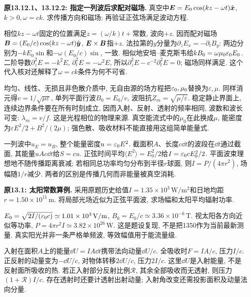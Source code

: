 \label{tb:wave-directions}
\begin{example}
\textbf{原13.12.1、13.12.2: 指定一列波后求配对磁场.} 真空中$\boldsymbol{E}=E_0\cos(kz-\omega t)\hat{\boldsymbol{x}}$, $k>0,\omega=ck$. 求传播方向和磁场; 再验证正弦场满足波动方程.
\end{example}
\begin{solution}
相位$kz-\omega t$固定的位置满足$z=(\omega/k)t+\text{常数}$, 波向$+z$. 因而配对磁场$\boldsymbol{B}=(E_0/c)\cos(kz-\omega t)\hat{\boldsymbol{y}}$, $\boldsymbol{E}\times\boldsymbol{B}$指$+z$. 法拉第的$y$分量为$\partial_zE_x=-\partial_tB_y$: 两边分别为$-kE_0\sin$和$-\omega(E_0/c)\sin$, 一致. 相似地安培--麦克斯韦给$kB_0=\omega\mu_0\varepsilon_0 E_0$. 二阶导数$\partial_z^2E=-k^2E$, $\partial_t^2E=-\omega^2E$, 所以$\partial_z^2E-c^{-2}\partial_t^2E=0$; 磁场同样满足. 这个代入核对还解释了$\omega=ck$条件为何不可省.
\end{solution}

均匀、线性、无损且非色散介质中, 无自由源的场方程把$\varepsilon_0,\mu_0$替换为$\varepsilon,\mu$. 同样消元得$v=1/\sqrt{\mu\varepsilon}$, 单列平面行波$B_0=E_0/v$, 波阻抗$Z_m=\sqrt{\mu/\varepsilon}$. 稳定静止界面上, 连续边界条件要在所有时刻成立, 因而入射、反射、透射的频率相同, 波数和波长可变: $\lambda_m=v/f$. 这是光程相位的物理来源. 真空能流式中的$\mu_0$在此换成$\mu$, 能密度为$\varepsilon E^2/2+B^2/(2\mu)$; 强色散、吸收材料不能直接用这组简单能量式.

\label{tb:solar}
一列波中$u_E=u_B$, 整个能量密度$u=\varepsilon_0 E^2$. 截面积$A$、长度$c\dd t$的波段在$\dd t$通过截面, 其能量$uAc\dd t$给$S=cu$. 正弦时间平均$\langle E^2\rangle=E_0^2/2$给$I=\varepsilon_0 cE_0^2/2$. 平面波束理想地不随传播距离衰减; 若相同总功率均匀分布到半径$r$球面, 则$I=P/(4\pi r^2)$, 场幅随$1/r$减少. 两者的区别是传播几何而非能量被真空消耗.

\begin{example}
\textbf{原13.1: 太阳常数算例.} 采用原题历史给值$I=1.35\times10^3\,\mathrm{W/m^2}$和日地均距$r=1.50\times10^{11}\,\mathrm m$. 将局部光场近似为正弦平面波, 求场幅和太阳平均辐射功率.
\end{example}
\begin{solution}
$E_0=\sqrt{2I/(\varepsilon_0 c)}\simeq1.01\times10^3\,\mathrm{V/m}$, $B_0=E_0/c\simeq3.36\times10^{-6}\,\mathrm T$. 视太阳各方向近似等功率, $P=4\pi r^2I\simeq3.82\times10^{26}\,\mathrm W$. 这是题设复现, 不是把1350作为当前最新测量. 真实阳光并非一条严格单频波, 等效幅值用于能流量级.
\end{solution}

入射在面积$A$上的能量$\dd U=IA\dd t$携带法向动量$\dd U/c$. 全吸收时$F=IA/c$, 压力$I/c$. 正反射的动量变为$-\dd U/c$, 对物体转移$2\dd U/c$, 压力$2I/c$. 这里$\dd U$是入射能量, 不是反射面所吸收的热. 若正入射部分反射比例$\mathcal R$, 其余全部吸收而无透射, 则压力$(1+\mathcal R)I/c$. 存在透射时还要计透射出射动量; 入射角改变还需投影面积及动量法向分量.

